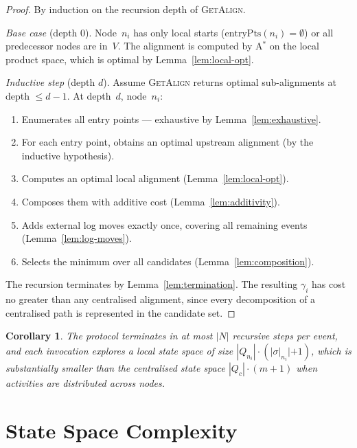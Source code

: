 \documentclass[11pt,a4paper]{article}
\newtheorem{corollary}{Corollary}
\newcommand{\Nodes}{N}
\newcommand{\alignment}{\gamma}
\newcommand{\trace}{\sigma}
\newcommand{\ep}{\mathrm{entryPts}}
\newcommand{\GA}{\textsc{GetAlign}}
\begin{document}
\begin{proof}
  By induction on the recursion depth of \GA{}.

  \medskip\noindent
  \emph{Base case} (depth $0$).\;
  Node~$n_i$ has only local starts ($\ep(n_i) = \emptyset$) or all
  predecessor nodes are in~$V$.
  The alignment is computed by A$^{*}$ on the local product space,
  which is optimal by Lemma~\ref{lem:local-opt}.

  \medskip\noindent
  \emph{Inductive step} (depth $d$).\;
  Assume \GA{} returns optimal sub-alignments at depth $\leq d-1$.
  At depth~$d$, node~$n_i$:
  \begin{enumerate}
    \item Enumerates all entry points — exhaustive by
          Lemma~\ref{lem:exhaustive}.
    \item For each entry point, obtains an optimal upstream alignment
          (by the inductive hypothesis).
    \item Computes an optimal local alignment
          (Lemma~\ref{lem:local-opt}).
    \item Composes them with additive cost
          (Lemma~\ref{lem:additivity}).
    \item Adds external log moves exactly once, covering all remaining
          events (Lemma~\ref{lem:log-moves}).
    \item Selects the minimum over all candidates
          (Lemma~\ref{lem:composition}).
  \end{enumerate}

  The recursion terminates by Lemma~\ref{lem:termination}.
  The resulting $\alignment_i$ has cost no greater than any
  centralised alignment, since every decomposition of a centralised
  path is represented in the candidate set.
\end{proof}

\begin{corollary}
  The protocol terminates in at most $|\Nodes|$ recursive steps per
  event, and each invocation explores a local state space of size
  $|Q_{n_i}| \cdot (|\trace|_{n_i}| + 1)$, which is substantially
  smaller than the centralised state space
  $|Q_c| \cdot (m + 1)$ when activities are distributed across nodes.
\end{corollary}

\section{State Space Complexity}
\label{sec:state-space}
\end{document}
